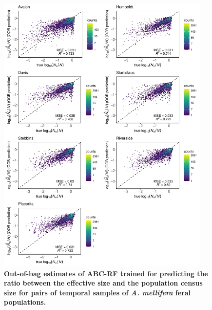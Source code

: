 \documentclass[a4paper, 12pt]{article}
\begin{document}
\begin{figure}[ht]
  \centering
  \includegraphics[width=0.95\textwidth]{Figures/FigureS25_combined_plot_nenc.pdf}
  \small\caption{\textbf{Out-of-bag estimates of ABC-RF trained for predicting the ratio between the effective size and the population census size for pairs of temporal samples of \textit{A. mellifera} feral populations.}}
  \label{fig:supple_feralbee_nen}
\end{figure}
\end{document}
